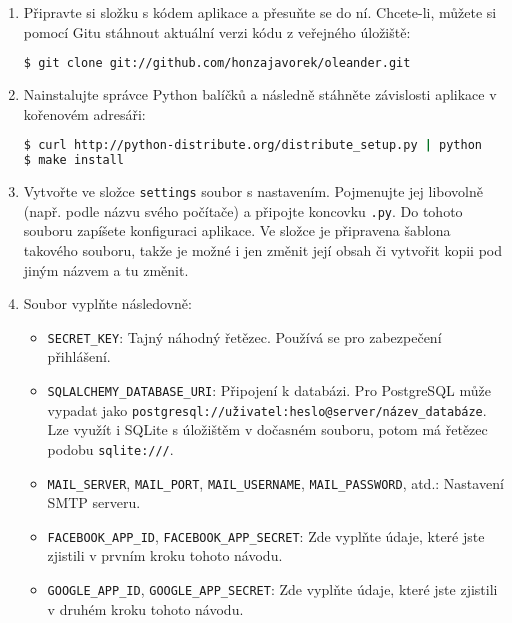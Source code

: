 \documentclass[12pt,oneside,final]{fithesis2}
\begin{document}
\begin{enumerate}
    \item Připravte si složku s kódem aplikace a přesuňte se do ní. Chcete-li, můžete si pomocí Gitu stáhnout aktuální verzi kódu z veřejného úložiště:

        \begin{lstlisting}[language=bash]
$ git clone git://github.com/honzajavorek/oleander.git
        \end{lstlisting}

    \item Nainstalujte správce Python balíčků a následně stáhněte závislosti aplikace v kořenovém adresáři:

        \begin{lstlisting}[language=bash]
$ curl http://python-distribute.org/distribute_setup.py | python
$ make install
        \end{lstlisting}

    \item Vytvořte ve složce {\tt settings} soubor s nastavením. Pojmenujte jej libovolně (např. podle názvu svého počítače) a připojte koncovku {\tt .py}. Do tohoto souboru zapíšete konfiguraci aplikace. Ve složce je připravena šablona takového souboru, takže je možné i jen změnit její obsah či vytvořit kopii pod jiným názvem a tu změnit.

    \item Soubor vyplňte následovně:

        \begin{itemize}
            \item {\tt SECRET\_KEY}: Tajný náhodný řetězec. Používá se pro zabezpečení přihlášení.
            \item {\tt SQLALCHEMY\_DATABASE\_URI}: Připojení k databázi. Pro PostgreSQL může vypadat jako {\tt post\-gresql://uživa\-tel:hes\-lo@ser\-ver/ná\-zev\_data\-báze}. Lze využít i SQLite s úložištěm v dočasném souboru, potom má řetězec podobu {\tt sqlite:///}.
            \item {\tt MAIL\_SERVER}, {\tt MAIL\_PORT}, {\tt MAIL\_USER\-NAME}, {\tt MAIL\_PASS\-WORD}, atd.: Nastavení SMTP serveru.
            \item {\tt FACEBOOK\_APP\_ID}, {\tt FACEBOOK\_APP\_SECRET}: Zde vyplňte údaje, které jste zjistili v prvním kroku tohoto návodu.
            \item {\tt GOOGLE\_APP\_ID}, {\tt GOOGLE\_APP\_SECRET}: Zde vyplňte údaje, které jste zjistili v druhém kroku tohoto návodu.
        \end{itemize}


\end{enumerate}
\end{document}
